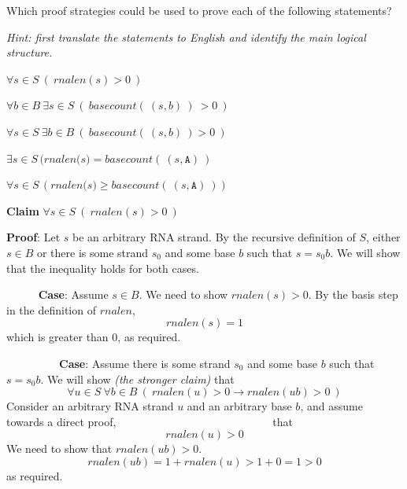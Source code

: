 \documentclass[12pt, oneside]{article}
\newcommand{\A}[0]{\texttt{A}}
\begin{document}
Which proof strategies could be used to prove each of the following statements?

{\it Hint: first translate the statements to English and identify the main logical structure.}

$\forall s \in S~(~rnalen(s) > 0~)$

\vspace{100pt}

$\forall b \in B~\exists s \in S~(~basecount(~(s,b)~)~ > 0~)$

\vspace{100pt}

$\forall s \in S ~\exists b\in B ~(~basecount(~(s,b)~) > 0~)$

\vspace{100pt}

$\exists s \in S \, (\textit{rnalen(s)} = \textit{basecount}(~(s, \A)~)$

\vspace{100pt}

$\forall s \in S \, (\textit{rnalen(s)} \geq \textit{basecount}(~(s, \A)~))$

\vspace{100pt}

 \newpage


{\bf Claim} $\forall s \in S ~(~rnalen(s) > 0~)$

{\bf Proof}: Let $s$ be an arbitrary RNA strand. By the recursive definition of $S$,
either $s \in B$ or there is some strand $s_0$ and some base $b$ such that $s = s_0 b$.
We will show that the inequality holds for both cases.

{$\phantom{Basis}$} {\bf Case}: Assume $s \in B$. We need to show $rnalen(s) > 0$. 
By the basis step in the definition of $rnalen$,
$$rnalen(s) = 1$$
which is greater than $0$, as required.

{$\phantom{Recursive}$} {\bf Case}: Assume there is some strand $s_0$ and some base $b$ 
such that $s = s_0 b$. We will show {\it (the stronger claim)} that 
\[
    \forall u \in S ~\forall b \in B ~( ~\textit{rnalen}(u) >0  \to 
    \textit{rnalen}(ub) >0 ~)
\]
Consider an arbitrary RNA strand $u$ and an arbitrary base $b$, and assume towards a
direct proof,$~~{\phantom{ this is the induction hypothesis}}~~$ that
\[
    rnalen(u) > 0
\]
We need to show that $rnalen(ub) > 0$.
\[
    rnalen(ub) = 1 + rnalen (u) > 1 + 0 = 1 > 0
\]
as required. 

     \newpage
\end{document}
